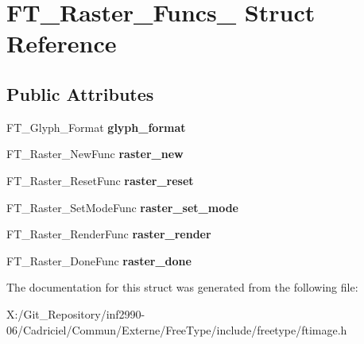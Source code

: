 \hypertarget{struct_f_t___raster___funcs__}{\section{F\-T\-\_\-\-Raster\-\_\-\-Funcs\-\_\- Struct Reference}
\label{struct_f_t___raster___funcs__}
}
\subsection*{Public Attributes}
\begin{DoxyCompactItemize}
\item 
\hypertarget{struct_f_t___raster___funcs___a741b43afa16f1f1b7f633cebd9f1d6a9}{F\-T\-\_\-\-Glyph\-\_\-\-Format {\bfseries glyph\-\_\-format}}\label{struct_f_t___raster___funcs___a741b43afa16f1f1b7f633cebd9f1d6a9}

\item 
\hypertarget{struct_f_t___raster___funcs___a31c9df9af6636df8a17a11bcd921b6a4}{F\-T\-\_\-\-Raster\-\_\-\-New\-Func {\bfseries raster\-\_\-new}}\label{struct_f_t___raster___funcs___a31c9df9af6636df8a17a11bcd921b6a4}

\item 
\hypertarget{struct_f_t___raster___funcs___a91e9decd6066090a5f306f33f9815d39}{F\-T\-\_\-\-Raster\-\_\-\-Reset\-Func {\bfseries raster\-\_\-reset}}\label{struct_f_t___raster___funcs___a91e9decd6066090a5f306f33f9815d39}

\item 
\hypertarget{struct_f_t___raster___funcs___a3b37c781e54cf933cb60f57f2d45b32c}{F\-T\-\_\-\-Raster\-\_\-\-Set\-Mode\-Func {\bfseries raster\-\_\-set\-\_\-mode}}\label{struct_f_t___raster___funcs___a3b37c781e54cf933cb60f57f2d45b32c}

\item 
\hypertarget{struct_f_t___raster___funcs___a7479a3def4522ce2667d6772e7bb96a5}{F\-T\-\_\-\-Raster\-\_\-\-Render\-Func {\bfseries raster\-\_\-render}}\label{struct_f_t___raster___funcs___a7479a3def4522ce2667d6772e7bb96a5}

\item 
\hypertarget{struct_f_t___raster___funcs___aecfd50bb6567d4442c997467cd68c857}{F\-T\-\_\-\-Raster\-\_\-\-Done\-Func {\bfseries raster\-\_\-done}}\label{struct_f_t___raster___funcs___aecfd50bb6567d4442c997467cd68c857}

\end{DoxyCompactItemize}


The documentation for this struct was generated from the following file\-:\begin{DoxyCompactItemize}
\item 
X\-:/\-Git\-\_\-\-Repository/inf2990-\/06/\-Cadriciel/\-Commun/\-Externe/\-Free\-Type/include/freetype/ftimage.\-h\end{DoxyCompactItemize}

